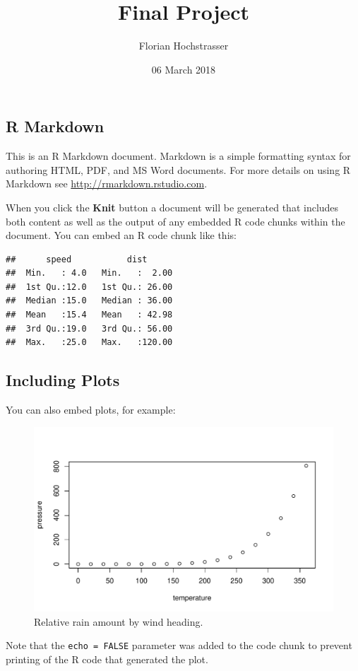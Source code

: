 \documentclass[]{article}
\title{Final Project}
\author{Florian Hochstrasser}
\date{06 March 2018}
\begin{document}
\maketitle

\subsection{R Markdown}\label{r-markdown}

This is an R Markdown document. Markdown is a simple formatting syntax
for authoring HTML, PDF, and MS Word documents. For more details on
using R Markdown see \url{http://rmarkdown.rstudio.com}.

When you click the \textbf{Knit} button a document will be generated
that includes both content as well as the output of any embedded R code
chunks within the document. You can embed an R code chunk like this:

\begin{verbatim}
##      speed           dist       
##  Min.   : 4.0   Min.   :  2.00  
##  1st Qu.:12.0   1st Qu.: 26.00  
##  Median :15.0   Median : 36.00  
##  Mean   :15.4   Mean   : 42.98  
##  3rd Qu.:19.0   3rd Qu.: 56.00  
##  Max.   :25.0   Max.   :120.00
\end{verbatim}

\subsection{Including Plots}\label{including-plots}

You can also embed plots, for example:

\begin{figure}

{\centering \includegraphics[width=0.7\linewidth]{./figures/pressure-1} 

}

\caption{Relative rain amount by wind heading.}\label{fig:pressure}
\end{figure}

Note that the \texttt{echo\ =\ FALSE} parameter was added to the code
chunk to prevent printing of the R code that generated the plot.
\end{document}
